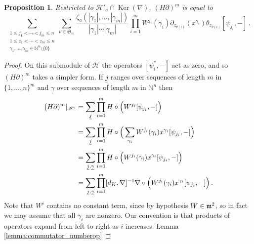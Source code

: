 \documentclass[english,letter paper,12pt,leqno]{article}
\newtheorem{proposition}[theorem]{Proposition}
\theoremstyle{example}
\numberwithin{equation}{section}
\def\Ker{\operatorname{Ker}}
\def\be{\begin{equation}}
\def\ee{\end{equation}}
\begin{document}
\begin{proposition}\label{prop:hpartialmrestrict} Restricted to $\mathscr{H}'_a \cap \Ker(\nabla)$, $(H \partial)^m$ is equal to
\be\label{eq:hpartialmrestrict}
\sum_{\substack{1 \le j_1 < \cdots < j_m \le n \\ 1 \le z_1 < \cdots < z_m \le n \\ \gamma_1,\ldots,\gamma_m \in \mathbb{N}^n \setminus \{0\}}} \sum_{\nu \in \mathfrak{S}_m} \frac{\zeta_{a}( |\gamma_1|,\ldots,|\gamma_m| )}{|\gamma_1| \cdots |\gamma_m|} \prod_{i=1}^m W^{j_i}(\gamma_i) \partial_{z_{\nu(i)}}(x^{\gamma_i}) \theta_{z_{\nu(i)}} [ \psi_{j_i}, - ]\,.
\ee
\end{proposition}
\begin{proof}
On this submodule of $\mathscr{H}$ the operators $[\psi_i^*,-]$ act as zero, and so $(H \partial)^m$ takes a simpler form. If $\underline{j}$ ranges over sequences of length $m$ in $\{1,\ldots,n\}^m$ and $\underline{\gamma}$ over sequences of length $m$ in $\mathbb{N}^n$ then
\begin{align*}
\big( H \partial )^m \arrowvert_{\mathscr{H}'} &= \sum_{\underline{j}} \prod_{i=1}^m H \circ \Big( W^{j_i} [ \psi_{j_i}, - ] \Big)\\
&= \sum_{\underline{j}} \prod_{i=1}^m H \circ \Big( \sum_{\gamma_i} W^{j_i}(\gamma_i) x^{\gamma_i} [ \psi_{j_i}, - ] \Big)\\
&= \sum_{\underline{j}, \underline{\gamma}} \prod_{i=1}^m H \circ \Big( W^{j_i}(\gamma_i) x^{\gamma_i} [ \psi_{j_i}, - ] \Big)\\
&= \sum_{\underline{j}, \underline{\gamma}} \prod_{i=1}^m [d_K, \nabla]^{-1} \nabla \circ \Big( W^{j_i}(\gamma_i) x^{\gamma_i} [ \psi_{j_i}, - ] \Big)\,.
\end{align*}
Note that $W^i$ contains no constant term, since by hypothesis $W \in \mathfrak{m}^2$, so in fact we may assume that all $\gamma_i$ are nonzero. Our convention is that products of operators expand from left to right as $i$ increases. Lemma \ref{lemma:commutator_numberop}


\end{proof}
\end{document}
